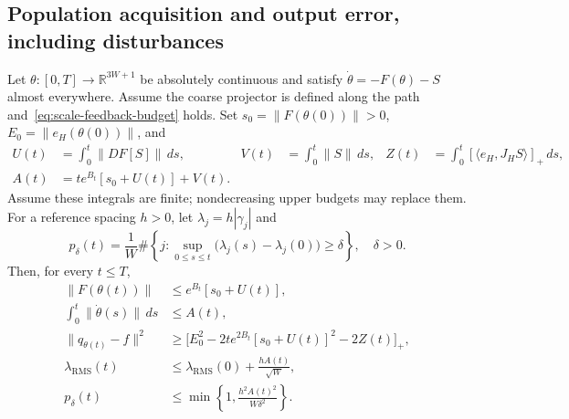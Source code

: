 \subsection{Population acquisition and output error, including disturbances}
\begin{theorem}
\label{thm:scale-precise}
Let $\theta:[0,T]\to\mathbb R^{3W+1}$ be absolutely continuous and satisfy
$\dot\theta=-F(\theta)-S$ almost everywhere. Assume the coarse projector
is defined along the path and~\eqref{eq:scale-feedback-budget} holds.
Set $s_0=\|F(\theta(0))\|>0$, $E_0=\|e_H(\theta(0))\|$, and
\begin{equation}
\begin{aligned}
U(t)&=\int_0^t\|DF[S]\|\,ds,&
V(t)&=\int_0^t\|S\|\,ds,&
Z(t)&=\int_0^t[\langle e_H,J_HS\rangle]_+\,ds,\\
A(t)&=t e^{B_t}[s_0+U(t)]+V(t).
\end{aligned}
\label{eq:scale-disturbances}
\end{equation}
Assume these integrals are finite; nondecreasing upper budgets may replace
them. For a reference spacing $h>0$, let $\lambda_j=h|\gamma_j|$ and
\begin{equation}
p_\delta(t)=\frac1W\#\left\{j:
\sup_{0\le s\le t}\bigl(\lambda_j(s)-\lambda_j(0)\bigr)\ge\delta\right\},
\quad\delta>0.
\end{equation}
Then, for every $t\le T$,
\begin{align}
\|F(\theta(t))\|&\le e^{B_t}[s_0+U(t)],\label{eq:scale-force-bound}\\
\int_0^t\|\dot\theta(s)\|\,ds&\le A(t),\label{eq:scale-travel-bound}\\
\|q_{\theta(t)}-f\|^2&\ge
\bigl[E_0^2-2t e^{2B_t}[s_0+U(t)]^2-2Z(t)\bigr]_+,\label{eq:scale-error-bound}\\
\lambda_{\mathrm{RMS}}(t)&\le\lambda_{\mathrm{RMS}}(0)
+\frac{hA(t)}{\sqrt W},\label{eq:scale-rms-bound}\\
p_\delta(t)&\le\min\left\{1,\frac{h^2A(t)^2}{W\delta^2}\right\}.
\label{eq:scale-count-bound}
\end{align}
\end{theorem}
